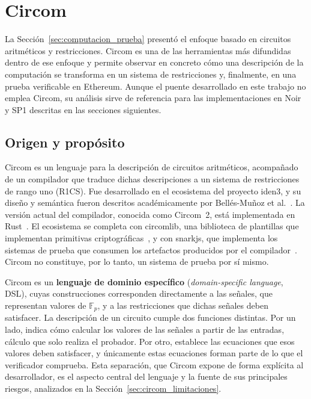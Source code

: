 \section{Circom}
\label{sec:circom}

La Sección~\ref{sec:computacion_prueba} presentó el enfoque basado en circuitos aritméticos y
restricciones. Circom es una de las herramientas más difundidas dentro de ese enfoque y permite
observar en concreto cómo una descripción de la computación se transforma en un sistema de
restricciones y, finalmente, en una prueba verificable en Ethereum. Aunque el puente desarrollado
en este trabajo no emplea Circom, su análisis sirve de referencia para las implementaciones en
Noir y SP1 descritas en las secciones siguientes.

\subsection{Origen y propósito}
\label{sec:circom_origen}

Circom es un lenguaje para la descripción de circuitos aritméticos, acompañado de un compilador
que traduce dichas descripciones a un sistema de restricciones de rango uno (R1CS). Fue
desarrollado en el ecosistema del proyecto iden3, y su diseño y semántica fueron descritos
académicamente por Bellés-Muñoz et al.~\cite{belles2023circom}. La versión actual del
compilador, conocida como Circom~2, está implementada en Rust~\cite{circomdocs}. El ecosistema se
completa con circomlib, una biblioteca de plantillas que implementan primitivas
criptográficas~\cite{circomlib}, y con
snarkjs, que implementa los sistemas de prueba que consumen los artefactos producidos por el
compilador~\cite{snarkjs}. Circom no constituye, por lo tanto, un sistema de prueba por sí mismo.

Circom es un \textbf{lenguaje de dominio específico} (\textit{domain-specific language}, DSL),
cuyas construcciones corresponden directamente a las señales, que representan valores de
$\mathbb{F}_p$, y a las restricciones que dichas señales deben satisfacer. La descripción de un
circuito cumple dos funciones distintas. Por un lado, indica cómo calcular los valores de las
señales a partir de las entradas, cálculo que solo realiza el probador. Por otro, establece las
ecuaciones que esos valores deben satisfacer, y únicamente estas ecuaciones forman parte de lo
que el verificador comprueba. Esta separación, que Circom expone de forma explícita al
desarrollador, es el aspecto central del lenguaje y la fuente de sus principales riesgos,
analizados en la Sección~\ref{sec:circom_limitaciones}.

